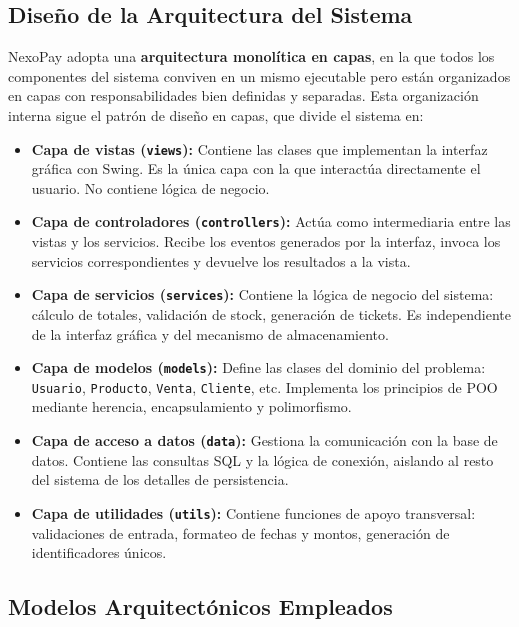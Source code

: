 \documentclass[12pt,a4paper]{report}
\begin{document}
\subsection{Diseño de la Arquitectura del Sistema}

NexoPay adopta una \textbf{arquitectura monolítica en capas}, en la que todos los componentes del sistema conviven en un mismo ejecutable pero están organizados en capas con responsabilidades bien definidas y separadas. Esta organización interna sigue el patrón de diseño en capas, que divide el sistema en:

\begin{itemize}
    \item \textbf{Capa de vistas (\texttt{views}):} Contiene las clases que implementan la interfaz gráfica con Swing. Es la única capa con la que interactúa directamente el usuario. No contiene lógica de negocio.
    \item \textbf{Capa de controladores (\texttt{controllers}):} Actúa como intermediaria entre las vistas y los servicios. Recibe los eventos generados por la interfaz, invoca los servicios correspondientes y devuelve los resultados a la vista.
    \item \textbf{Capa de servicios (\texttt{services}):} Contiene la lógica de negocio del sistema: cálculo de totales, validación de stock, generación de tickets. Es independiente de la interfaz gráfica y del mecanismo de almacenamiento.
    \item \textbf{Capa de modelos (\texttt{models}):} Define las clases del dominio del problema: \texttt{Usuario}, \texttt{Producto}, \texttt{Venta}, \texttt{Cliente}, etc. Implementa los principios de POO mediante herencia, encapsulamiento y polimorfismo.
    \item \textbf{Capa de acceso a datos (\texttt{data}):} Gestiona la comunicación con la base de datos. Contiene las consultas SQL y la lógica de conexión, aislando al resto del sistema de los detalles de persistencia.
    \item \textbf{Capa de utilidades (\texttt{utils}):} Contiene funciones de apoyo transversal: validaciones de entrada, formateo de fechas y montos, generación de identificadores únicos.
\end{itemize}

\subsection{Modelos Arquitectónicos Empleados}
\end{document}
